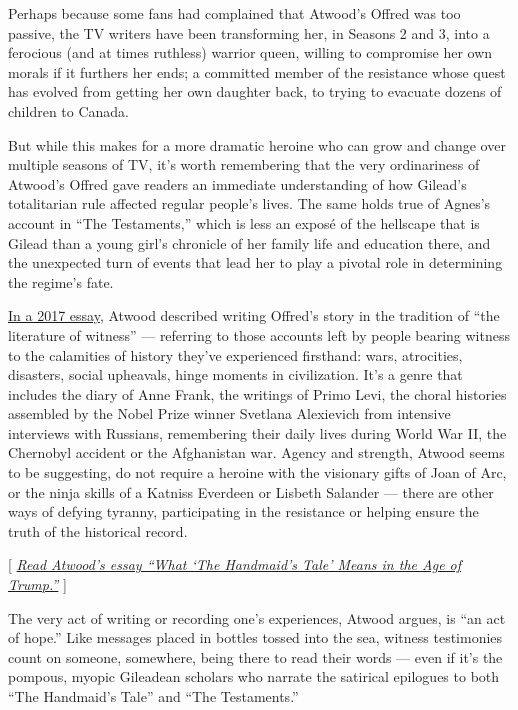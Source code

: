 Perhaps because some fans had complained that Atwood's Offred was too
passive, the TV writers have been transforming her, in Seasons 2 and 3,
into a ferocious (and at times ruthless) warrior queen, willing to
compromise her own morals if it furthers her ends; a committed member of
the resistance whose quest has evolved from getting her own daughter
back, to trying to evacuate dozens of children to Canada.

But while this makes for a more dramatic heroine who can grow and change
over multiple seasons of TV, it's worth remembering that the very
ordinariness of Atwood's Offred gave readers an immediate understanding
of how Gilead's totalitarian rule affected regular people's lives. The
same holds true of Agnes's account in ``The Testaments,'' which is less
an exposé of the hellscape that is Gilead than a young girl's chronicle
of her family life and education there, and the unexpected turn of
events that lead her to play a pivotal role in determining the regime's
fate.

\href{https://www.nytimes.com/2017/03/10/books/review/margaret-atwood-handmaids-tale-age-of-trump.html}{In
a 2017 essay}, Atwood described writing Offred's story in the tradition
of ``the literature of witness'' --- referring to those accounts left by
people bearing witness to the calamities of history they've experienced
firsthand: wars, atrocities, disasters, social upheavals, hinge moments
in civilization. It's a genre that includes the diary of Anne Frank, the
writings of Primo Levi, the choral histories assembled by the Nobel
Prize winner Svetlana Alexievich from intensive interviews with
Russians, remembering their daily lives during World War II, the
Chernobyl accident or the Afghanistan war. Agency and strength, Atwood
seems to be suggesting, do not require a heroine with the visionary
gifts of Joan of Arc, or the ninja skills of a Katniss Everdeen or
Lisbeth Salander --- there are other ways of defying tyranny,
participating in the resistance or helping ensure the truth of the
historical record.

{[}
\emph{\href{https://www.nytimes.com/2017/03/10/books/review/margaret-atwood-handmaids-tale-age-of-trump.html}{Read
Atwood's essay ``What `The Handmaid's Tale' Means in the Age of
Trump.''}} {]}

The very act of writing or recording one's experiences, Atwood argues,
is ``an act of hope.'' Like messages placed in bottles tossed into the
sea, witness testimonies count on someone, somewhere, being there to
read their words --- even if it's the pompous, myopic Gileadean scholars
who narrate the satirical epilogues to both ``The Handmaid's Tale'' and
``The Testaments.''

